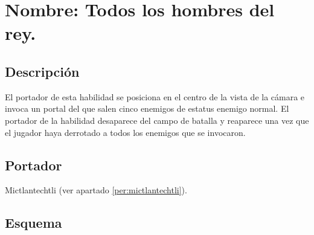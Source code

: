 \section{Nombre: Todos los hombres del rey.}\label{hab.TodoRey}
\subsection{Descripción}
El portador de esta habilidad se posiciona en el centro de la vista de la cámara e invoca un portal del que salen cinco enemigos de estatus enemigo normal. El portador de la habilidad desaparece del campo de batalla y reaparece una vez que el jugador haya derrotado a todos los enemigos que se invocaron.  
\subsection{Portador}
Mictlantechtli (ver apartado \ref{per:mictlantechtli}).	
\subsection{Esquema}
			